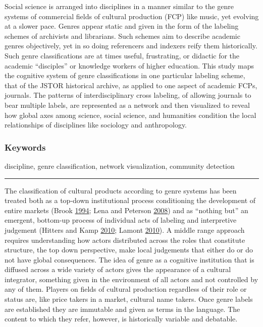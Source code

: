 \documentclass[]{book}
\theoremstyle{definition}
\theoremstyle{definition}
\theoremstyle{definition}
\theoremstyle{remark}
\begin{document}
Social science is arranged into disciplines in a manner
similar to the genre systems of commercial fields of cultural production
(FCP) like music, yet evolving at a slower pace. Genres appear static
and given in the form of the labeling schemes of archivists and
librarians. Such schemes aim to describe academic genres objectively,
yet in so doing referencers and indexers reify them historically. Such
genre classifications are at times useful, frustrating, or didactic for
the academic ``disciples'' or knowledge workers of higher education.
This study maps the cognitive system of genre classifications in one
particular labeling scheme, that of the JSTOR historical archive, as
applied to one aspect of academic FCPs, journals. The patterns of
interdisciplinary cross labeling, of allowing journals to bear multiple
labels, are represented as a network and then visualized to reveal how
global axes among science, social science, and humanities condition the
local relationships of disciplines like sociology and anthropology.

\hypertarget{keywords-1}{%
\subsubsection*{Keywords}\label{keywords-1}}


discipline, genre classification, network visualization,
community detection

\begin{center}\rule{0.5\linewidth}{\linethickness}\end{center}

The classification of cultural products according to genre systems has
been treated both as a top-down institutional process conditioning the
development of entire markets (Brook
\protect\hyperlink{ref-Brook1994Symphonie}{1994}; Lena and Peterson
\protect\hyperlink{ref-Lena2008Classification}{2008}) and as ``nothing
but'' an emergent, bottom-up process of individual acts of labeling and
interpretive judgement (Hitters and Kamp
\protect\hyperlink{ref-Hitters2010Tune}{2010}; Lamont
\protect\hyperlink{ref-Lamont2010How}{2010}). A middle range approach
requires understanding how actors distributed across the roles that
constitute structure, the top down perspective, make local judgements
that either do or do not have global consequences. The idea of genre as
a cognitive institution that is diffused across a wide variety of actors
gives the appearance of a cultural integrator, something given in the
environment of all actors and not controlled by any of them. Players on
fields of cultural production regardless of their role or status are,
like price takers in a market, cultural name takers. Once genre labels
are established they are immutable and given as terms in the language.
The content to which they refer, however, is historically variable and
debatable.
\end{document}
